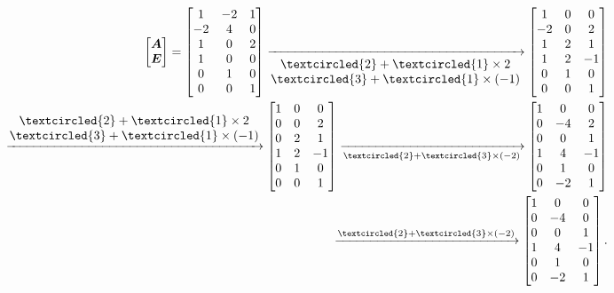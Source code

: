 \documentclass[compress,mathserif,cjk]{beamer}
\theoremstyle{remark}
\numberwithin{equation}{section}
\begin{document}
\begin{CJK}{UTF8}{gbsn}
\begin{frame}\small
\begin{eqnarray*}
&&\left[\begin{matrix}\bm A\\\bm E\end{matrix}\right]=\left[\begin{matrix}1&-2&1\\-2&4&0\\1&0&2\\1&0&0\\0&1&0\\0&0&1\end{matrix}\right]
\xrightarrow[\begin{matrix}\textcircled{\scriptsize 2}+\textcircled{\scriptsize 1}\times2\\\textcircled{\scriptsize 3}+\textcircled{\scriptsize 1}\times(-1)\end{matrix}]{}
\left[\begin{matrix}1&0&0\\-2&0&2\\1&2&1\\1&2&-1\\0&1&0\\0&0&1\end{matrix}\right]\\
&&\hspace{2em}\xrightarrow{\begin{matrix}\textcircled{\scriptsize 2}+\textcircled{\scriptsize 1}\times2\\\textcircled{\scriptsize 3}+\textcircled{\scriptsize 1}\times(-1)\end{matrix}}
\left[\begin{matrix}1&0&0\\0&0&2\\0&2&1\\1&2&-1\\0&1&0\\0&0&1\end{matrix}\right]
\xrightarrow[\textcircled{\scriptsize 2}+\textcircled{\scriptsize 3}\times(-2)]{}\left[\begin{matrix}1&0&0\\0&-4&2\\0&0&1\\1&4&-1\\0&1&0\\0&-2&1\end{matrix}\right]\\
&&\hspace{2em}\xrightarrow{\textcircled{\scriptsize 2}+\textcircled{\scriptsize 3}\times(-2)}\left[\begin{matrix}1&0&0\\0&-4&0\\0&0&1\\1&4&-1\\0&1&0\\0&-2&1\end{matrix}\right].
\end{eqnarray*}
\end{frame}


\end{CJK}
\end{document}
